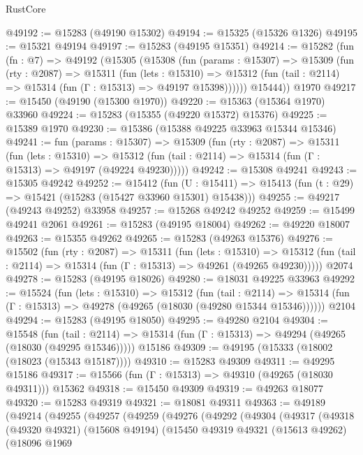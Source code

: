 \begin{lexlean}{RustCore}
\begin{coremodule}
@49192 := @15283 (@49190 @15302)
@49194 := @15325 (@15326 @1326)
@49195 := @15321 @49194
@49197 := @15283 (@49195 @15351)
@49214 := @15282
    (fun (fn : @7) =>
    @49192
      (@15305
        (@15308
          (fun (params : @15307) =>
          @15309
            (fun (rty : @2087) =>
            @15311
              (fun (lets : @15310) =>
              @15312 (fun (tail : @2114) => @15314 (fun (Γ : @15313) => @49197 @15398))))))
        @15444))
    @1970
@49217 := @15450 (@49190 (@15300 @1970))
@49220 := @15363 (@15364 @1970) @33960
@49224 := @15283 (@15355 (@49220 @15372) @15376)
@49225 := @15389 @1970
@49230 := @15386 (@15388 @49225 @33963 @15344 @15346)
@49241 := fun (params : @15307) =>
  @15309
    (fun (rty : @2087) =>
    @15311
      (fun (lets : @15310) =>
      @15312 (fun (tail : @2114) => @15314 (fun (Γ : @15313) => @49197 (@49224 @49230)))))
@49242 := @15308 @49241
@49243 := @15305 @49242
@49252 := @15412
    (fun (U : @15411) => @15413 (fun (t : @29) => @15421 (@15283 (@15427 @33960 @15301) @15438)))
@49255 := @49217 (@49243 @49252) @33958
@49257 := @15268 @49242 @49252
@49259 := @15499 @49241 @2061
@49261 := @15283 (@49195 @18004)
@49262 := @49220 @18007
@49263 := @15355 @49262
@49265 := @15283 (@49263 @15376)
@49276 := @15502
    (fun (rty : @2087) =>
    @15311
      (fun (lets : @15310) =>
      @15312 (fun (tail : @2114) => @15314 (fun (Γ : @15313) => @49261 (@49265 @49230)))))
    @2074
@49278 := @15283 (@49195 @18026)
@49280 := @18031 @49225 @33963
@49292 := @15524
    (fun (lets : @15310) =>
    @15312
      (fun (tail : @2114) =>
      @15314 (fun (Γ : @15313) => @49278 (@49265 (@18030 (@49280 @15344 @15346))))))
    @2104
@49294 := @15283 (@49195 @18050)
@49295 := @49280 @2104
@49304 := @15548
    (fun (tail : @2114) => @15314 (fun (Γ : @15313) => @49294 (@49265 (@18030 (@49295 @15346)))))
    @15186
@49309 := @49195 (@15333 (@18002 (@18023 (@15343 @15187))))
@49310 := @15283 @49309
@49311 := @49295 @15186
@49317 := @15566 (fun (Γ : @15313) => @49310 (@49265 (@18030 @49311))) @15362
@49318 := @15450 @49309
@49319 := @49263 @18077
@49320 := @15283 @49319
@49321 := @18081 @49311
@49363 := @49189
    (@49214
      (@49255
        (@49257
          (@49259
            (@49276
              (@49292
                (@49304
                  (@49317
                    (@49318
                      (@49320 @49321)
                      (@15608 @49194)
                      (@15450
                        @49319
                        @49321
                        (@15613 @49262)
                        (@18096
                          @1969

\end{coremodule}
\end{lexlean}
